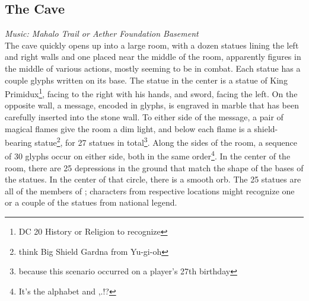 \subsection{The Cave}
\textit{Music: Mahalo Trail or Aether Foundation Basement}\\
The cave quickly opens up into a large room, with a dozen statues lining the left and right walls and one placed near the middle of the room, apparently figures in the middle of various actions, mostly seeming to be in combat. Each statue has a couple glyphs written on its base. The statue in the center is a statue of King Primidux\footnote{DC 20 History or Religion to recognize}, facing to the right with his hands, and sword, facing the left. On the opposite wall, a message, encoded in glyphs, is engraved in marble that has been carefully inserted into the stone wall. To either side of the message, a pair of magical flames give the room a dim light, and below each flame is a shield-bearing statue\footnote{think Big Shield Gardna from Yu-gi-oh}, for 27 statues in total\footnote{because this scenario occurred on a player's 27th birthday}. Along the sides of the room, a sequence of 30 glyphs occur on either side, both in the same order\footnote{It's the alphabet and ,.!?}. In the center of the room, there are 25 depressions in the ground that match the shape of the bases of the statues. In the center of that circle, there is a smooth orb. The 25 statues are all of the members of ; characters from respective locations might recognize one or a couple of the statues from national legend.

